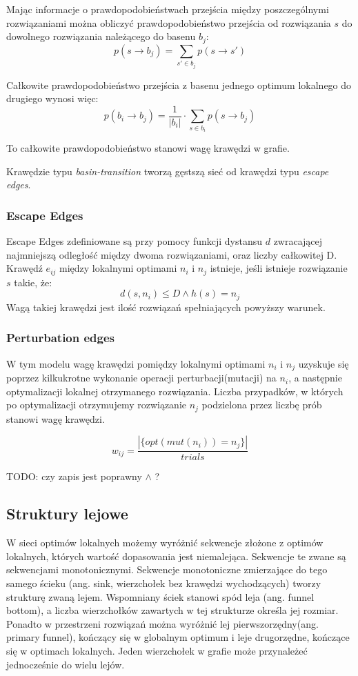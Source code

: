 Mając informacje o prawdopodobieństwach przejścia między poszczególnymi rozwiązaniami można obliczyć prawdopodobieństwo
przejścia od rozwiązania $s$ do dowolnego rozwiązania należącego do basenu $b_j$:
$$p(s \rightarrow b_j) = \sum_{s'\in{b_j}} p(s \rightarrow s')$$

Całkowite prawdopodobieństwo przejścia z basenu jednego optimum lokalnego do drugiego wynosi więc:
$$p(b_i \rightarrow b_j) = \frac{1}{|b_i|} \cdot \sum_{s\in{b_i}} p(s \rightarrow b_j)$$

To całkowite prawdopodobieństwo stanowi wagę krawędzi w grafie.

Krawędzie typu \textit{basin-transition} tworzą gęstszą sieć od krawędzi typu \textit{escape edges}.

\subsubsection*{Escape Edges}
Escape Edges zdefiniowane są przy pomocy funkcji dystansu $d$ zwracającej najmniejszą odległość między dwoma rozwiązaniami,
oraz liczby całkowitej D.
Krawędź $e_{ij}$ między lokalnymi optimami $n_i$ i $n_j$ istnieje, jeśli istnieje rozwiązanie $s$ takie, że:
$$d(s, n_i) \leq D \land h(s)=n_j$$
Wagą takiej krawędzi jest ilość rozwiązań spełniających powyższy warunek.

\subsubsection{Perturbation edges}
W tym modelu wagę krawędzi pomiędzy lokalnymi optimami $n_i$ i $n_j$ uzyskuje się poprzez kilkukrotne wykonanie
operacji perturbacji(mutacji) na $n_i$, a następnie optymalizacji lokalnej otrzymanego rozwiązania.
Liczba przypadków, w których po optymalizacji otrzymujemy rozwiązanie $n_j$ podzielona przez liczbę prób stanowi wagę krawędzi.

$$
      w_{ij} = \frac{ |\{opt(mut(n_i)) = n_j\}| }{trials}
$$

TODO: czy zapis jest poprawny $\land$ ?

\subsection{Struktury lejowe}
W sieci optimów lokalnych możemy wyróżnić sekwencje złożone z optimów lokalnych, których wartość dopasowania jest niemalejąca.
Sekwencje te zwane są sekwencjami monotonicznymi\cite{DBLP:journals/heuristics/OchoaV18}.
Sekwencje monotoniczne zmierzające do tego samego ścieku (ang. sink, wierzchołek bez krawędzi wychodzących)
tworzy strukturę zwaną lejem. Wspomniany ściek stanowi spód leja (ang. funnel bottom), a liczba wierzchołków zawartych w tej strukturze określa jej rozmiar.
Ponadto w przestrzeni rozwiązań można wyróżnić lej pierwszorzędny(ang. primary funnel), kończący się w globalnym optimum i leje drugorzędne,
kończące się w optimach lokalnych. Jeden wierzchołek w grafie może przynależeć jednocześnie do wielu lejów.

